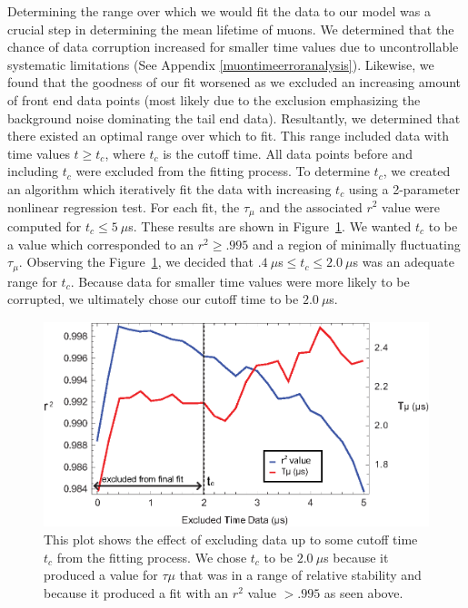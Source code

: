 Determining the range over which we would fit the data to our model
was a crucial step in determining the mean lifetime of muons.  We
determined that the chance of data corruption increased for smaller
time values due to uncontrollable systematic
limitations (See Appendix \ref{muontimeerroranalysis}). Likewise, we found that the goodness of our fit worsened as
we excluded an increasing amount of front end data points (most likely
due to the exclusion emphasizing the background noise dominating the
tail end data).  Resultantly, we determined that there existed an
optimal range over which to fit.  This range included data with time
values $t \geq t_{c}$, where $t_{c}$ is the cutoff time.  All data
points before and including $t_{c}$ were excluded from the fitting
process.  To determine $t_{c}$, we created an algorithm which
iteratively fit the data with increasing $t_{c}$ using a 2-parameter
nonlinear regression test.  For each fit, the $\tau_{\mu}$ and the
associated $r^{2}$ value were computed for $t_{c}\leq 5~\mu$s.  These
results are shown in Figure~\ref{fig:rsq}.  We wanted $t_{c}$ to be a
value which corresponded to an $r^{2} \geq .995$ and a region of
minimally fluctuating $\tau_{\mu}$.  Observing the Figure~\ref{fig:rsq}, we decided
that $.4~\mu$s$ \leq t_{c}\leq 2.0~\mu$s was an adequate range for $t_{c}$.
Because data for smaller time values were more likely to be corrupted,
we ultimately chose our cutoff time to be $2.0~\mu$s.


\begin{figure}[htbp]
\begin{center}
\includegraphics[height=60mm]{./figures/lifetime_fit_param.eps}
\caption{This plot shows the effect of excluding data up to some cutoff time $t_{c}$ from the fitting process.  We chose $t_{c}$ to be $2.0~\mu$s because it produced a value for $\tau{\mu}$ that was in a range of relative stability and because it produced a fit with an $r^{2}$ value $> .995$ as seen above.}
\label{fig:rsq}
\end{center}
\end{figure}

